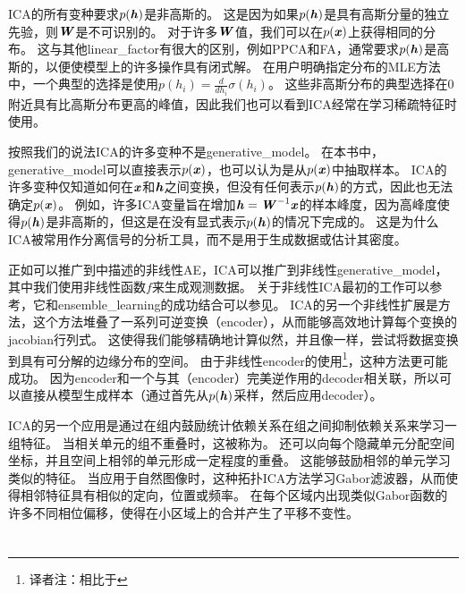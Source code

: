 \gls{ICA}的所有变种要求$p(\boldsymbol{\mathit{h}})$是非高斯的。
这是因为如果$p(\boldsymbol{\mathit{h}})$是具有高斯分量的独立先验，则$\boldsymbol{\mathit{W}}$是不可识别的。
对于许多$\boldsymbol{\mathit{W}}$值，我们可以在$p(\boldsymbol{\mathit{x}})$上获得相同的分布。 
这与其他\gls{linear_factor}有很大的区别，例如\gls{PPCA}和\gls{FA}，通常要求$p(\boldsymbol{\mathit{h}})$是高斯的，以便使模型上的许多操作具有闭式解。
在用户明确指定分布的\gls{MLE}方法中，一个典型的选择是使用$p(h_i) = \frac{d}{dh_i}\sigma(h_i)$。
这些非高斯分布的典型选择在0附近具有比高斯分布更高的峰值，因此我们也可以看到\gls{ICA}经常在学习稀疏特征时使用。




按照我们的说法\gls{ICA}的许多变种不是\gls{generative_model}。
 在本书中，\gls{generative_model}可以直接表示$p(\boldsymbol{\mathit{x}})$，也可以认为是从$p(\boldsymbol{\mathit{x}})$中抽取样本。
\gls{ICA}的许多变种仅知道如何在$\boldsymbol{\mathit{x}}$和$\boldsymbol{\mathit{h}}$之间变换，但没有任何表示$p(\boldsymbol{\mathit{h}})$的方式，因此也无法确定$p(\boldsymbol{\mathit{x}})$。
例如，许多\gls{ICA}变量旨在增加$\boldsymbol{\mathit{h}} = \boldsymbol{\mathit{W}}^{-1}\boldsymbol{\mathit{x}}$的样本峰度，因为高峰度使得$p(\boldsymbol{\mathit{h}})$是非高斯的，但这是在没有显式表示$p(\boldsymbol{\mathit{h}})$的情况下完成的。
这是为什么\gls{ICA}被常用作分离信号的分析工具，而不是用于生成数据或估计其密度。


正如可以推广到中描述的非线性\gls{AE}，\gls{ICA}可以推广到非线性\gls{generative_model}，其中我们使用非线性函数$f$来生成观测数据。
关于非线性\gls{ICA}最初的工作可以参考\citet{hyvarinen1999nonlinear}，它和\gls{ensemble_learning}的成功结合可以参见\citet{roberts2001independent,lappalainen2000nonlinear}。
\gls{ICA}的另一个非线性扩展是方法\citep{Dinh-et-al-arxiv2014}，这个方法堆叠了一系列可逆变换（\gls{encoder}），从而能够高效地计算每个变换的\gls{jacobian}行列式。
这使得我们能够精确地计算似然，并且像一样，尝试将数据变换到具有可分解的边缘分布的空间。
由于非线性\gls{encoder}的使用\footnote{译者注：相比于}，这种方法更可能成功。
因为\gls{encoder}和一个与其（\gls{encoder}）完美逆作用的\gls{decoder}相关联，所以可以直接从模型生成样本（通过首先从$p(\boldsymbol{\mathit{h}})$采样，然后应用\gls{decoder}）。


\gls{ICA}的另一个应用是通过在组内鼓励统计依赖关系在组之间抑制依赖关系来学习一组特征。
当相关单元的组不重叠时，这被称为。
还可以向每个隐藏单元分配空间坐标，并且空间上相邻的单元形成一定程度的重叠。
这能够鼓励相邻的单元学习类似的特征。
当应用于自然图像时，这种拓扑\gls{ICA}方法学习Gabor滤波器，从而使得相邻特征具有相似的定向，位置或频率。
在每个区域内出现类似Gabor函数的许多不同相位偏移，使得在小区域上的合并产生了平移不变性。


\section{}
\label{sec:slow_feature_analysis}


